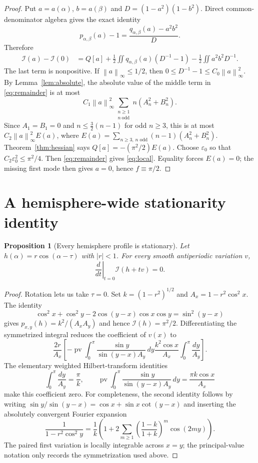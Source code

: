 \documentclass[11pt]{article}
\newtheorem{proposition}{Proposition}
\newcommand{\I}{\mathcal I}
\newcommand{\norm}[1]{\left\lVert#1\right\rVert}
\begin{document}
\begin{proof}
Put $a=a(\alpha)$, $b=a(\beta)$ and
$D=(1-a^2)(1-b^2)$.  Direct common-denominator algebra gives the exact identity
\begin{equation}\label{eq:identity}
 p_{\alpha,\beta}(a)-1=\frac{q_{\alpha,\beta}(a)-a^2b^2}{D}.
\end{equation}
Therefore
\begin{align}
 \I(a)-\I(0)
 &=Q[a]+\frac12\iint q_{\alpha,\beta}(a)(D^{-1}-1)
   -\frac12\iint a^2b^2D^{-1}.\label{eq:remainder}
\end{align}
The last term is nonpositive.  If $\norm a_\infty\le1/2$, then
$0\le D^{-1}-1\le C_0\norm a_\infty^2$.  By Lemma~\ref{lem:absolute}, the absolute value of the middle term in \eqref{eq:remainder} is at most
\[
 C_1\norm a_\infty^2
 \sum_{\substack{n\ge1\\n\ \mathrm{odd}}}n(A_n^2+B_n^2).
\]
Since $A_1=B_1=0$ and $n\le\frac32(n-1)$ for odd $n\ge3$, this is at most
$C_2\norm a_\infty^2 E(a)$, where
$E(a)=\sum_{n\ge3,\,n\text{ odd}}(n-1)(A_n^2+B_n^2)$.
Theorem~\ref{thm:hessian} says $Q[a]=-(\pi^2/2)E(a)$.  Choose
$\varepsilon_0$ so that $C_2\varepsilon_0^2\le\pi^2/4$.  Then
\eqref{eq:remainder} gives \eqref{eq:local}.  Equality forces $E(a)=0$; the missing first mode then gives $a=0$, hence $f\equiv\pi/2$.
\end{proof}

\section{A hemisphere-wide stationarity identity}

\begin{proposition}[Every hemisphere profile is stationary]\label{prop:stationary}
Let $h(\alpha)=r\cos(\alpha-\tau)$ with $|r|<1$.  For every smooth antiperiodic variation $v$,
\[
 \left.\frac d{dt}\right|_{t=0}\I(h+tv)=0.
\]
\end{proposition}

\begin{proof}
Rotation lets us take $\tau=0$.  Set $k=(1-r^2)^{1/2}$ and
$A_x=1-r^2\cos^2x$.  The identity
\[
 \cos^2x+\cos^2y-2\cos(y-x)\cos x\cos y=\sin^2(y-x)
\]
gives $p_{x,y}(h)=k^2/(A_xA_y)$ and hence $\I(h)=\pi^2/2$.  Differentiating the symmetrized integral reduces the coefficient of $v(x)$ to
\[
 \frac{2r}{A_x}\left[-\operatorname{pv}\!\int_0^\pi
 \frac{\sin y}{\sin(y-x)A_y}\,dy
 \frac{k^2\cos x}{A_x}\int_0^\pi\frac{dy}{A_y}\right].
\]
The elementary weighted Hilbert-transform identities
\[
 \int_0^\pi\frac{dy}{A_y}=\frac\pi k,
 \qquad
 \operatorname{pv}\!\int_0^\pi
 \frac{\sin y}{\sin(y-x)A_y}\,dy=\frac{\pi k\cos x}{A_x}
\]
make this coefficient zero.  For completeness, the second identity follows by writing
$\sin y/\sin(y-x)=\cos x+\sin x\cot(y-x)$ and inserting the absolutely convergent Fourier expansion
\[
 \frac1{1-r^2\cos^2y}=\frac1k\left(1+2\sum_{m\ge1}
 \left(\frac{1-k}{1+k}\right)^m\cos(2my)\right).
\]
The paired first variation is locally integrable across $x=y$; the principal-value notation only records the symmetrization used above.
\end{proof}
\end{document}

